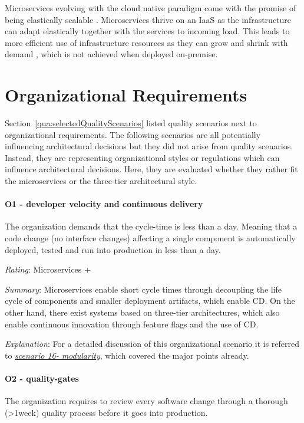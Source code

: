 Microservices evolving with the cloud native paradigm come with the promise of being elastically scalable \citep[p. 7]{Stine2015} \cite{12FactorProcesses2012}.
Microservices thrive on an \ac{IaaS} as the infrastructure can adapt elastically together with the services to incoming load.
This leads to more efficient use of infrastructure resources as they can grow and shrink with demand \citep[p.203f]{Newman2015}, which is not achieved when deployed on-premise.

\section{Organizational Requirements}
\label{quaMicro:tradeoffOrgRequirements}
Section~\ref{qua:selectedQualityScenarios} listed quality scenarios next to organizational requirements.
The following scenarios are all potentially influencing architectural decisions but they did not arise from quality scenarios.
Instead, they are representing organizational styles or regulations which can influence architectural decisions.
Here, they are evaluated whether they rather fit the microservices or the three-tier architectural style.

\paragraph{O1 - developer velocity and continuous delivery}
The organization demands that the cycle-time is less than a day. Meaning that a code change (no interface changes) affecting a single component is automatically deployed, tested and run into production in less than a day.
\label{quaMicro:so1}

\textit{Rating}: Microservices +

\textit{Summary}:
Microservices enable short cycle times through decoupling the life cycle of components and smaller deployment artifacts, which enable \ac{CD}. 
On the other hand, there exist systems based on three-tier architectures, which also enable continuous innovation through feature flags and the use of \ac{CD}.

\textit{Explanation}:
For a detailed discussion of this organizational scenario it is referred to \textit{ \hyperref[quaMicro:s16]{scenario 16- modularity}}, which covered the major points already.

\paragraph{O2 - quality-gates}
The organization requires to review every software change through a thorough (>1week) quality process before it goes into production.
\label{quaMicro:so2}


